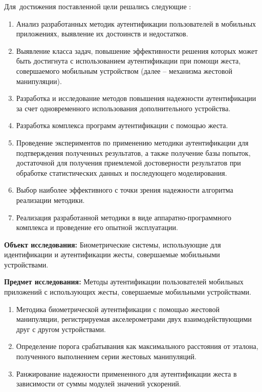 Для~достижения поставленной цели решались следующие {\tasks}:
\begin{enumerate}
  \item Анализ разработанных методик аутентификации пользователей в мобильных приложениях, выявление их достоинств и недостатков.
  \item Выявление класса задач, повышение эффективности решения которых может быть достигнута с использованием аутентификации при помощи жеста, совершаемого мобильным устройством (далее -- механизма жестовой манипуляции). 
  \item Разработка и исследование методов повышения надежности аутентификации за счет одновременного использования дополнительного устройства.
  \item Разработка комплекса программ аутентификации с помощью жеста.
  \item Проведение экспериментов по применению методики аутентификации для подтверждения полученных результатов, а также получение базы попыток, достаточной для получения приемлемой достоверности результатов при обработке статистических данных и последующего моделирования.
  \item Выбор наиболее эффективного с точки зрения надежности алгоритма реализации методики.
  \item Реализация разработанной методики в виде аппаратно-программного комплекса и проведение его опытной эксплуатации.
\end{enumerate}

\textbf{Объект исследования:} Биометрические системы, использующие для идентификации и аутентификации жесты, совершаемые мобильными устройствами. 

\textbf{Предмет исследования:} Методы аутентификации пользователей мобильных приложений с использующих жесты, совершаемые мобильными устройствами.

{\novelty}
\begin{enumerate}
  \item Методика биометрической аутентификации с помощью жестовой манипуляции, регистрируемая акселерометрами двух взаимодействующими друг с другом устройствами.
  \item Определение порога срабатывания как максимального расстояния от эталона, полученного выполнением серии жестовых манипуляций.
 \item Ранжирование  надежности примененного для аутентификации жеста в зависимости от суммы модулей значений ускорений.  
\end{enumerate}
 

